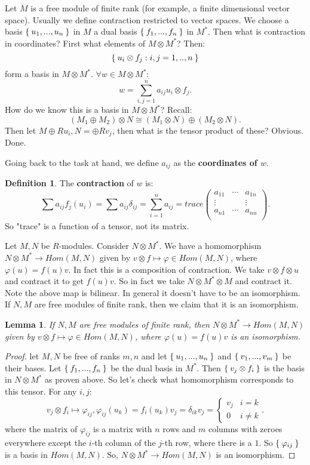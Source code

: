 \documentclass[12pt]{amsbook}
\theoremstyle{plain}
\numberwithin{section}{chapter}
\numberwithin{equation}{chapter}
\newtheorem{lem}[theorem]{Lemma}
\theoremstyle{definition}
\newtheorem{Def}[theorem]{Definition}
\theoremstyle{remark}
\newcommand{\tens}{\otimes}
\newcommand{\lpar}{\left(}
\newcommand{\rpar}{\right)}
\renewcommand{\phi}{\varphi}
\begin{document}
Let $M$ is a free module of finite rank (for example, a finite dimensional vector space). Usually we define contraction restricted to vector spaces. We choose a basis $\Set{u_1,...,u_n}$ in $M$ a dual basis $\Set{f_1,...,f_n}$ in $M^*$. Then what is contraction in coordinates? First what elements of $M \tens M^*$? Then:
$$
\Set{u_i \tens f_j:i,j = 1,..,n}
$$
form a basis in $M \tens M^*$. $\forall w \in M \tens M^*$:
$$
w = \sum_{i,j = 1}^n a_{ij}u_i \tens f_j.
$$
How do we know this is a basis in $M \tens M^*$? Recall: 
$$
(M_1 \oplus M_2) \tens N \cong (M_1 \tens N) \oplus (M_2 \tens N).
$$
Then let $M \oplus Ru_i,N = \oplus Rv_j$, then what is the tensor product of these? Obvious. Done. 

Going back to the task at hand, we define $a_{ij}$ as the \textbf{coordinates of $w$}. 

\begin{Def}
The \textbf{contraction }of $w$ is:
$$
\sum a_{ij}f_j(u_i) = \sum a_{ij}\delta_{ij} = \sum_{i  =1}^na_{ij} = trace\lpar 
\begin{matrix}
a_{11}& \cdots& a_{1n}\\
\vdots & & \vdots\\
a_{n1}& \cdots& a_{nn}\\
\end{matrix} \rpar.
$$
So "trace" is a function of a tensor, not its matrix. 
\end{Def}

Let $M,N$ be $R$-modules. Consider $N \tens M^*$. We have a homomorphism $N \tens M^* \to Hom(M,N)$ given by $v \tens f \mapsto \phi \in Hom(M,N)$, where $\phi(u) = f(u)v$. In fact this is a composition of contraction. We take $v \tens f \tens u$ and contract it to get $f(u)v$. So in fact we take $N \tens M^* \tens M$ and contract it. Note the above map is bilinear. In general it doesn't have to be an isomorphism. If $N,M$ are free modules of finite rank, then we claim that it is an isomorphism. 

\begin{lem}
If $N,M$ are free modules of finite rank, then $N \tens M^* \to Hom(M,N)$ given by $v \tens f \mapsto \phi \in Hom(M,N)$, where $\phi(u) = f(u)v$ is an isomorphism. 
\end{lem}

\begin{proof}
let $M,N$ be free of ranks $m,n$ and let $\Set{u_1,...,u_n}$ and $\Set{v_1,...,v_m}$ be their bases. Let $\Set{f_1,...,f_n}$ be the dual basis in $M^*$. Then $\Set{v_j \tens f_i}$ is the basis in $N \tens M^*$ as proven above. So let's check what homomorphism corresponds to this tensor. For any $i,j$: $$
v_j \tens f_i \mapsto \phi_{ij}, \phi_{ij}(u_k) = f_i(u_k)v_j = \delta_{ik}v_j = \begin{cases}
v_j & i = k\\
0 & i \neq k
\end{cases}. 
$$
where the matrix of $\phi_{ij}$ is a matrix with $n$ rows and $m$ columns with zeroes everywhere except the $i$-th column of the $j$-th row, where there is a $1$. So $\Set{\phi_{ij}}$ is a basis in $Hom(M,N)$. So, $N \tens M^* \to Hom(M,N)$ is an isomorphism. 
\end{proof}
\end{document}
